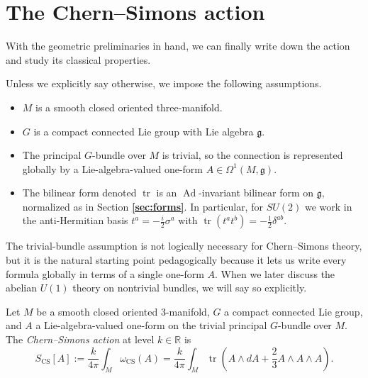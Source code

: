 \documentclass[11pt]{article}
\newcommand{\R}{\mathbb{R}}
\newcommand{\tr}{\operatorname{tr}}
\newcommand{\Ad}{\operatorname{Ad}}
\newcommand{\CS}{\operatorname{CS}}
\theoremstyle{definition}
\numberwithin{theorem}{section}
\numberwithin{equation}{section}
\begin{document}
\section{The Chern--Simons action}\label{sec:action}

With the geometric preliminaries in hand, we can finally write down the action and study its classical properties.

\begin{assumption}\label{ass:standing-CS}
Unless we explicitly say otherwise, we impose the following assumptions.
\begin{itemize}
\item $M$ is a smooth closed oriented three-manifold.
\item $G$ is a compact connected Lie group with Lie algebra $\mathfrak{g}$.
\item The principal $G$-bundle over $M$ is trivial, so the connection is represented globally by a Lie-algebra-valued one-form $A\in \Omega^1(M,\mathfrak{g})$.
\item The bilinear form denoted $\tr$ is an $\Ad$-invariant bilinear form on $\mathfrak{g}$, normalized as in Section \textbf{\ref{sec:forms}}. In particular, for $SU(2)$ we work in the anti-Hermitian basis $t^a = -\tfrac{i}{2}\sigma^a$ with $\tr(t^at^b) = -\tfrac{1}{2}\delta^{ab}$.
\end{itemize}
\end{assumption}

\noindent The trivial-bundle assumption is not logically necessary for Chern--Simons theory, but it is the natural starting point pedagogically because it lets us write every formula globally in terms of a single one-form $A$. When we later discuss the abelian $U(1)$ theory on nontrivial bundles, we will say so explicitly.

\begin{definition}\label{def:CS-action}
Let $M$ be a smooth closed oriented 3-manifold, $G$ a compact connected Lie group, and $A$ a Lie-algebra-valued one-form on the trivial principal $G$-bundle over $M$. The \emph{Chern--Simons action} at level $k\in \R$ is
\begin{equation}\label{eq:CS-action}
S_{\CS}[A] := \frac{k}{4\pi}\int_M \omega_{\CS}(A) = \frac{k}{4\pi}\int_M \tr\left(A\wedge dA + \frac{2}{3}A\wedge A\wedge A\right).
\end{equation}
\end{definition}
\end{document}
